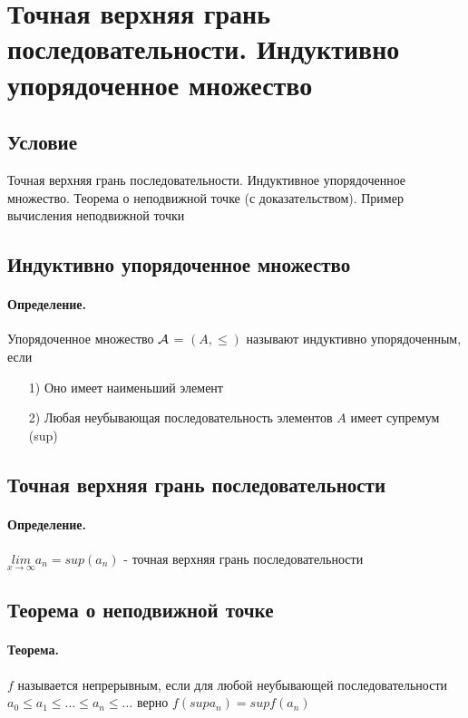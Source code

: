 \documentclass{report}
\begin{document}
\newpage

\section{Точная верхняя грань последовательности. Индуктивно упорядоченное множество}
\subsection{Условие}
Точная верхняя грань последовательности. Индуктивное упорядоченное множество.
Теорема о неподвижной точке (с доказательством). Пример вычисления неподвижной
точки

\subsection{Индуктивно упорядоченное множество}
\paragraph*{Определение.}
Упорядоченное множество ${\cal A}$ = $(A, \leq)$ называют индуктивно упорядоченным, если
\begin{itemize}
	\item[1)] Оно имеет наименьший элемент
	\item[2)] Любая неубывающая последовательность элементов $A$ имеет супремум (sup)
\end{itemize}

\subsection{Точная верхняя грань последовательности}
\paragraph*{Определение.}
$\underset{x\rightarrow \infty}{lim}a_{n} = sup(a_n)$ - точная верхняя грань последовательности

\subsection{Теорема о неподвижной точке}
\paragraph*{Теорема.}
$f$ называется непрерывным, если для любой неубывающей последовательности
$a_{0} \leq a_{1} \leq \ldots \leq a_{n} \leq \ldots$ верно
$f(supa_{n}) = supf(a_{n})$
\end{document}
